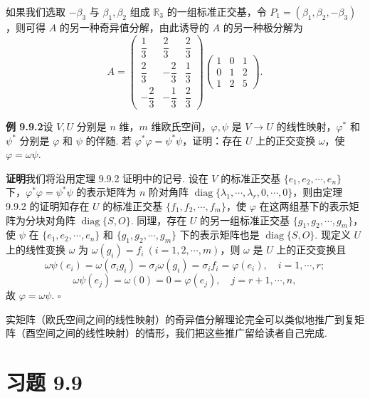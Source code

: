 \documentclass[UTF8,12pt,a4paper,fontset=fandol]{ctexart}
\begin{document}
如果我们选取 $-\beta_3$ 与 $\beta_1,\beta_2$ 组成 $\mathbb R_3$ 的一组标准正交基，令 $P_1=(\beta_1,\beta_2,-\beta_3)$，则可得 $A$ 的另一种奇异值分解，由此诱导的 $A$ 的另一种极分解为
\[
  A=
  \left(\begin{array}{ccc}
    \dfrac13 & \dfrac23 & \dfrac23\\
    \dfrac23 & -\dfrac23 & \dfrac13\\
    -\dfrac23 & -\dfrac13 & \dfrac23
  \end{array}\right)
  \left(\begin{array}{ccc}
    1 & 0 & 1\\
    0 & 1 & 2\\
    1 & 2 & 5
  \end{array}\right).
\]

\noindent\textbf{例 9.9.2}\quad 设 $V,U$ 分别是 $n$ 维，$m$ 维欧氏空间，$\varphi,\psi$ 是 $V\to U$ 的线性映射，$\varphi^*$ 和 $\psi^*$ 分别是 $\varphi$ 和 $\psi$ 的伴随. 若 $\varphi^*\varphi=\psi^*\psi$，证明：存在 $U$ 上的正交变换 $\omega$，使 $\varphi=\omega\psi$.

\noindent\textbf{证明}\quad 我们将沿用定理 9.9.2 证明中的记号. 设在 $V$ 的标准正交基 $\{e_1,e_2,\cdots,e_n\}$ 下，$\varphi^*\varphi=\psi^*\psi$ 的表示矩阵为 $n$ 阶对角阵 $\operatorname{diag}\{\lambda_1,\cdots,\lambda_r,0,\cdots,0\}$，则由定理 9.9.2 的证明知存在 $U$ 的标准正交基 $\{f_1,f_2,\cdots,f_m\}$，使 $\varphi$ 在这两组基下的表示矩阵为分块对角阵 $\operatorname{diag}\{S,O\}$. 同理，存在 $U$ 的另一组标准正交基 $\{g_1,g_2,\cdots,g_m\}$，使 $\psi$ 在 $\{e_1,e_2,\cdots,e_n\}$ 和 $\{g_1,g_2,\cdots,g_m\}$ 下的表示矩阵也是 $\operatorname{diag}\{S,O\}$. 现定义 $U$ 上的线性变换 $\omega$ 为 $\omega(g_i)=f_i\ (i=1,2,\cdots,m)$，则 $\omega$ 是 $U$ 上的正交变换且
\[
  \omega\psi(e_i)=\omega(\sigma_ig_i)=\sigma_i\omega(g_i)=\sigma_if_i=\varphi(e_i),\quad i=1,\cdots,r;
\]
\[
  \omega\psi(e_j)=\omega(0)=0=\varphi(e_j),\quad j=r+1,\cdots,n,
\]
故 $\varphi=\omega\psi$. $\square$

实矩阵（欧氏空间之间的线性映射）的奇异值分解理论完全可以类似地推广到复矩阵（酉空间之间的线性映射）的情形，我们把这些推广留给读者自己完成.

\section*{习题 9.9}
\end{document}

